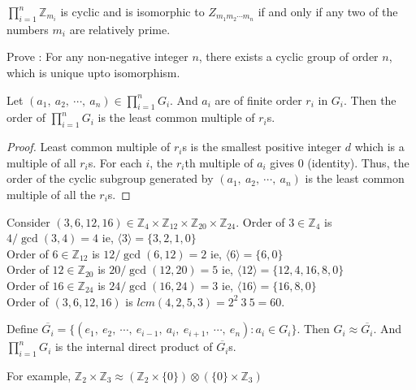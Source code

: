 \begin{corollary}
	$\prod\limits_{i = 1}^n \mathbb{Z}_{m_i}$ is cyclic and is isomorphic to $Z_{m_1m_2\cdots m_n}$ if and only if any two of the numbers $m_i$ are relatively prime.
\end{corollary}

\begin{question}
	Prove : For any non-negative integer $n$, there exists a cyclic group of order $n$, which is unique upto isomorphism.
\end{question}

\begin{theorem}
	Let $(a_1,\ a_2,\ \cdots,\ a_n) \in \prod\limits_{i = 1}^n G_i$. And $a_i$ are of finite order $r_i$ in $G_i$. Then the order of $\prod\limits_{i = 1}^n G_i$ is the least common multiple of $r_i$s.
\end{theorem}
\begin{proof}
	Least common multiple of $r_i$s is the smallest positive integer $d$ which is a multiple of all $r_i$s.
	For each $i$, the $r_i$th multiple of $a_i$ gives $0$ (identity).
	Thus, the order of the cyclic subgroup generated by $(a_1,\ a_2,\ \cdots,\ a_n)$ is the least common multiple of all the $r_i$s.
\end{proof}
\begin{remark}
	Consider $(3,6,12,16) \in \mathbb{Z}_4 \times \mathbb{Z}_{12} \times \mathbb{Z}_{20} \times \mathbb{Z}_{24}$.
	Order of $3 \in \mathbb{Z}_4$ is ${4}/{\gcd(3,4)} = 4$ ie, $\langle 3 \rangle = \{ 3,2,1,0 \}$\\
	Order of $6 \in \mathbb{Z}_{12}$ is ${12}/{\gcd(6,12)} = 2$ ie, $\langle 6 \rangle = \{ 6,0 \}$\\
	Order of $12 \in \mathbb{Z}_{20}$ is ${20}/{\gcd(12,20)} = 5$ ie, $\langle 12 \rangle = \{ 12,4,16,8,0 \}$\\
	Order of $16 \in \mathbb{Z}_{24}$ is ${24}/{\gcd(16,24)} = 3$ ie, $\langle 16 \rangle = \{ 16,8,0 \}$\\
	Order of $(3,6,12,16)$ is $lcm(4,2,5,3) = 2^2\ 3\ 5 = 60$.
\end{remark}

\begin{remark}
	Define $\overline{G_i} = \{ (e_1,\ e_2,\ \cdots,\ e_{i-1},\ a_i,\ e_{i+1},\ \cdots,\ e_n) : a_i \in G_i\}$.
	Then $G_i \approx \overline{G_i}$.
	And $\prod\limits_{i=1}^n G_i$ is the internal direct product of $\overline{G_i}$s.

	For example, $\mathbb{Z}_2 \times \mathbb{Z}_3 \approx \left( \mathbb{Z}_2 \times \{ 0 \} \right) \otimes \left( \{ 0 \} \times \mathbb{Z}_3 \right)$
\end{remark}

